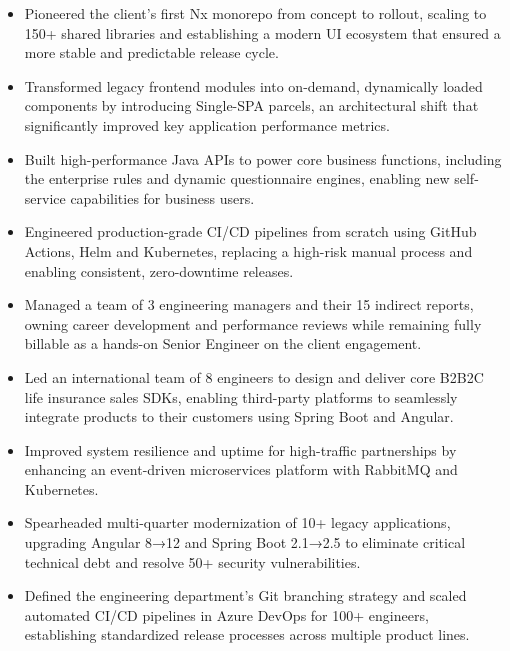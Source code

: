 \begin{itemize}[leftmargin=*]
    \item Pioneered the client's first Nx monorepo from concept to rollout, scaling to 150+ shared libraries and establishing a modern UI ecosystem that ensured a more stable and predictable release cycle.
    \item Transformed legacy frontend modules into on-demand, dynamically loaded components by introducing Single-SPA parcels, an architectural shift that significantly improved key application performance metrics.
    \item Built high-performance Java APIs to power core business functions, including the enterprise rules and dynamic questionnaire engines, enabling new self-service capabilities for business users.
    \item Engineered production-grade CI/CD pipelines from scratch using GitHub Actions, Helm and Kubernetes, replacing a high-risk manual process and enabling consistent, zero-downtime releases.
    \item Managed a team of 3 engineering managers and their 15 indirect reports, owning career development and performance reviews while remaining fully billable as a hands-on Senior Engineer on the client engagement.
\end{itemize}
\vspace{\jobGroupBottomMargin}

\begin{itemize}[leftmargin=*]
    \item Led an international team of 8 engineers to design and deliver core B2B2C life insurance sales SDKs, enabling third-party platforms to seamlessly integrate products to their customers using Spring Boot and Angular.
    \item Improved system resilience and uptime for high-traffic partnerships by enhancing an event-driven microservices platform with RabbitMQ and Kubernetes.
    \item Spearheaded multi-quarter modernization of 10+ legacy applications, upgrading Angular 8→12 and Spring Boot 2.1→2.5 to eliminate critical technical debt and resolve 50+ security vulnerabilities.
    \item Defined the engineering department's Git branching strategy and scaled automated CI/CD pipelines in Azure DevOps for 100+ engineers, establishing standardized release processes across multiple product lines.
\end{itemize}
\vspace{\jobGroupBottomMargin}

